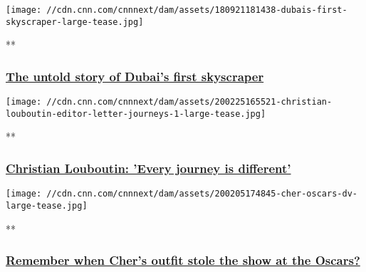 \href{/videos/style/2018/09/21/dubais-first-skyscraper-lon-orig.cnn/video/playlists/cnn-style/}{}

\texttt{[image: //cdn.cnn.com/cnnnext/dam/assets/180921181438-dubais-first-skyscraper-large-tease.jpg]}

**

\hypertarget{the-untold-story-of-dubais-first-skyscraper}{%
\subsubsection{\texorpdfstring{\href{/videos/style/2018/09/21/dubais-first-skyscraper-lon-orig.cnn/video/playlists/cnn-style/}{The
untold story of Dubai's first
skyscraper}}{The untold story of Dubai's first skyscraper}}\label{the-untold-story-of-dubais-first-skyscraper}}

\href{/videos/fashion/2020/02/25/christian-louboutin-style-guest-editor-lon-orig.cnn/video/playlists/cnn-style/}{}

\texttt{[image: //cdn.cnn.com/cnnnext/dam/assets/200225165521-christian-louboutin-editor-letter-journeys-1-large-tease.jpg]}

**

\hypertarget{christian-louboutin-every-journey-is-different}{%
\subsubsection{\texorpdfstring{\href{/videos/fashion/2020/02/25/christian-louboutin-style-guest-editor-lon-orig.cnn/video/playlists/cnn-style/}{Christian
Louboutin: 'Every journey is
different'}}{Christian Louboutin: 'Every journey is different'}}\label{christian-louboutin-every-journey-is-different}}

\href{/videos/style/2020/02/05/remember-when-cher-oscars-1986-bob-mackie-lon-orig.cnn/video/playlists/cnn-style/}{}

\texttt{[image: //cdn.cnn.com/cnnnext/dam/assets/200205174845-cher-oscars-dv-large-tease.jpg]}

**

\hypertarget{remember-when-chers-outfit-stole-the-show-at-the-oscars}{%
\subsubsection{\texorpdfstring{\href{/videos/style/2020/02/05/remember-when-cher-oscars-1986-bob-mackie-lon-orig.cnn/video/playlists/cnn-style/}{Remember
when Cher's outfit stole the show at the
Oscars?}}{Remember when Cher's outfit stole the show at the Oscars?}}\label{remember-when-chers-outfit-stole-the-show-at-the-oscars}}

